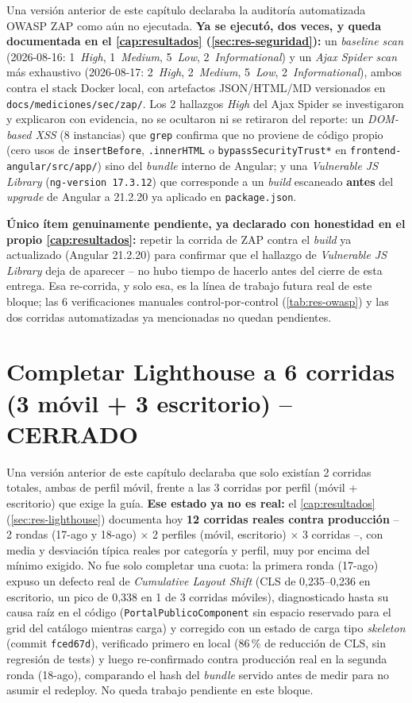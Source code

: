 Una versión anterior de este capítulo declaraba la auditoría
automatizada OWASP ZAP como aún no ejecutada. \textbf{Ya se ejecutó, dos
veces, y queda documentada en el \autoref{cap:resultados}
(\autoref{sec:res-seguridad}):} un \emph{baseline scan}
(2026-08-16: 1~\emph{High}, 1~\emph{Medium}, 5~\emph{Low},
2~\emph{Informational}) y un \emph{Ajax Spider scan} más exhaustivo
(2026-08-17: 2~\emph{High}, 2~\emph{Medium}, 5~\emph{Low},
2~\emph{Informational}), ambos contra el stack Docker local, con
artefactos JSON/HTML/MD versionados en \texttt{docs/mediciones/sec/zap/}.
Los 2 hallazgos \emph{High} del Ajax Spider se investigaron y explicaron
con evidencia, no se ocultaron ni se retiraron del reporte: un
\emph{DOM-based XSS} (8 instancias) que \texttt{grep} confirma que no
proviene de código propio (cero usos de \texttt{insertBefore},
\texttt{.innerHTML} o \texttt{bypassSecurityTrust*} en
\texttt{frontend-angular/src/app/}) sino del \emph{bundle} interno de
Angular; y una \emph{Vulnerable JS Library} (\texttt{ng-version 17.3.12})
que corresponde a un \emph{build} escaneado \textbf{antes} del
\emph{upgrade} de Angular a 21.2.20 ya aplicado en
\texttt{package.json}.

\textbf{Único ítem genuinamente pendiente, ya declarado con honestidad en
el propio \autoref{cap:resultados}:} repetir la corrida de ZAP contra el
\emph{build} ya actualizado (Angular 21.2.20) para confirmar que el
hallazgo de \emph{Vulnerable JS Library} deja de aparecer -- no hubo
tiempo de hacerlo antes del cierre de esta entrega. Esa re-corrida, y
solo esa, es la línea de trabajo futura real de este bloque; las 6
verificaciones manuales control-por-control (\autoref{tab:res-owasp}) y
las dos corridas automatizadas ya mencionadas no quedan pendientes.

\section{Completar Lighthouse a 6 corridas (3 móvil + 3 escritorio) -- CERRADO}

Una versión anterior de este capítulo declaraba que solo existían 2
corridas totales, ambas de perfil móvil, frente a las 3 corridas por
perfil (móvil + escritorio) que exige la guía. \textbf{Ese estado ya no
es real:} el \autoref{cap:resultados} (\autoref{sec:res-lighthouse})
documenta hoy \textbf{12 corridas reales contra producción} -- 2 rondas
(17-ago y 18-ago) $\times$ 2 perfiles (móvil, escritorio) $\times$ 3
corridas --, con media y desviación típica reales por categoría y
perfil, muy por encima del mínimo exigido. No fue solo completar una
cuota: la primera ronda (17-ago) expuso un defecto real de
\emph{Cumulative Layout Shift} (CLS de 0,235--0,236 en escritorio, un
pico de 0,338 en 1 de 3 corridas móviles), diagnosticado hasta su causa
raíz en el código (\texttt{PortalPublicoComponent} sin espacio reservado
para el grid del catálogo mientras carga) y corregido con un estado de
carga tipo \emph{skeleton} (commit \texttt{fced67d}), verificado primero
en local (86\,\% de reducción de CLS, sin regresión de tests) y luego
re-confirmado contra producción real en la segunda ronda (18-ago),
comparando el hash del \emph{bundle} servido antes de medir para no
asumir el redeploy. No queda trabajo pendiente en este bloque.

